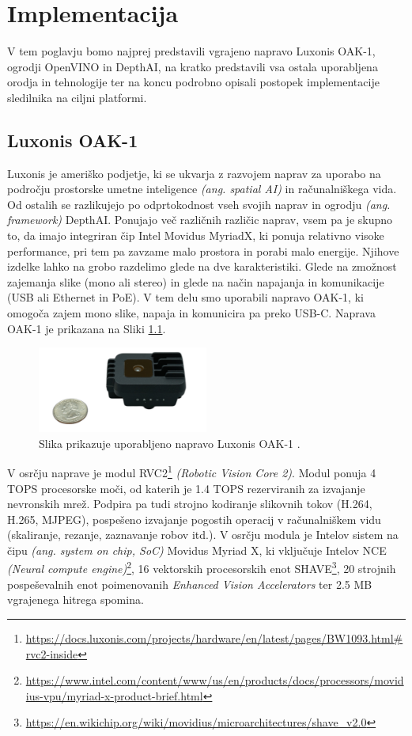 \documentclass[a4paper,12pt,openright]{book}
\begin{document}
\chapter{Implementacija}
\label{ch:3}
V tem poglavju bomo najprej predstavili vgrajeno napravo Luxonis OAK-1, ogrodji OpenVINO in DepthAI, na kratko predstavili vsa ostala uporabljena orodja in tehnologije ter na koncu podrobno opisali postopek implementacije sledilnika na ciljni platformi.

\section{Luxonis OAK-1}
Luxonis je ameriško podjetje, ki se ukvarja z razvojem naprav za uporabo na področju prostorske umetne inteligence \emph{(ang. spatial AI)} in računalniškega vida. Od ostalih se razlikujejo po odprtokodnost vseh svojih naprav in ogrodju \emph{(ang. framework)} DepthAI. Ponujajo več različnih različic naprav, vsem pa je skupno to, da imajo integriran čip Intel Movidus MyriadX, ki ponuja relativno visoke performance, pri tem pa zavzame malo prostora in porabi malo energije. Njihove izdelke lahko na grobo razdelimo glede na dve karakteristiki. Glede na zmožnost zajemanja slike (mono ali stereo) in glede na način napajanja in komunikacije (USB ali Ethernet in PoE). V tem delu smo uporabili napravo OAK-1, ki omogoča zajem mono slike, napaja in komunicira pa preko USB-C. Naprava OAK-1 je prikazana na Sliki \ref{img:oak}.

\begin{figure}[ht]
    \begin{center}
        \includegraphics[width=0.5\textwidth]{img/oak-1.png}
    \end{center}
    \caption{Slika prikazuje uporabljeno napravo Luxonis OAK-1 \cite{luxonis}.}
    \label{img:oak}
\end{figure}


\bigskip
\bigskip
V osrčju naprave je modul RVC2\footnote{\url{https://docs.luxonis.com/projects/hardware/en/latest/pages/BW1093.html\#rvc2-inside}} \emph{(Robotic Vision Core 2)}. Modul ponuja 4 TOPS procesorske moči, od katerih je 1.4 TOPS rezerviranih za izvajanje nevronskih mrež. Podpira pa tudi strojno kodiranje slikovnih tokov (H.264, H.265, MJPEG), pospešeno izvajanje pogostih operacij v računalniškem vidu (skaliranje, rezanje, zaznavanje robov itd.). V osrčju modula je Intelov sistem na čipu \emph{(ang. system on chip, SoC)} Movidus Myriad X, ki vključuje Intelov NCE \emph{(Neural compute engine)}\footnote{\url{https://www.intel.com/content/www/us/en/products/docs/processors/movidius-vpu/myriad-x-product-brief.html}}, 16 vektorskih procesorskih enot SHAVE\footnote{\url{https://en.wikichip.org/wiki/movidius/microarchitectures/shave\_v2.0}}, 20 strojnih pospeševalnih enot poimenovanih \emph{Enhanced Vision Accelerators} ter 2.5 MB vgrajenega hitrega spomina.
\end{document}
